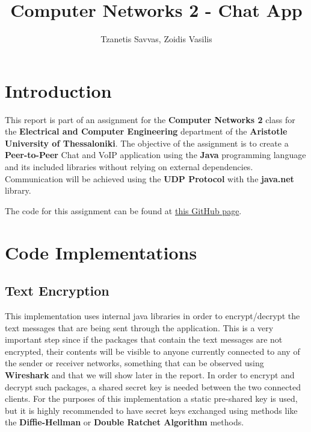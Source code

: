 \documentclass[12pt]{report}
\begin{document}

\title{\textbf{Computer Networks 2 - Chat App}}
\author{Tzanetis Savvas, Zoidis Vasilis}
\maketitle  %

\tableofcontents  %
\newpage

\chapter{Introduction}

This report is part of an assignment for the \textbf{Computer Networks 2} class for the \textbf{Electrical and Computer Engineering} department of the \textbf{Aristotle University of Thessaloniki}. The objective of the assignment is to create a \textbf{Peer-to-Peer} Chat and VoIP application using the \textbf{Java} programming language and its included libraries without relying on external dependencies. Communication will be achieved using the \textbf{UDP Protocol} with the \textbf{java.net} library.

The code for this assignment can be found at \href{https://github.com/stzanetis/p2p-chatapp}{this GitHub page}.

\chapter{Code Implementations}
\section{Text Encryption}
This implementation uses internal java libraries in order to encrypt/decrypt the text messages that are being sent through the application. This is a very important step since if the packages that contain the text messages are not encrypted, their contents will be visible to anyone currently connected to any of the sender or receiver networks, something that can be observed using \textbf{Wireshark} and that we will show later in the report. In order to encrypt and decrypt such packages, a shared secret key is needed between the two connected clients. For the purposes of this implementation a static pre-shared key is used, but it is highly recommended to have secret keys exchanged using methods like the \textbf{Diffie-Hellman} or \textbf{Double Ratchet Algorithm} methods.
\end{document}

